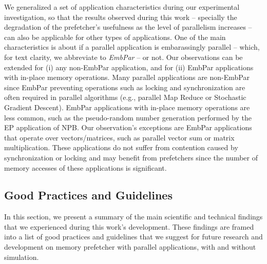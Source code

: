 \documentclass[AMA,final,STIX1COL]{WileyNJD-v2}
\begin{document}
We generalized a set of application characteristics during our experimental investigation, so that the results observed during this work -- specially the degradation of the prefetcher's usefulness as the level of parallelism increases -- can also be applicable for other types of applications. 
One of the main characteristics is about if a parallel application is embarassingly parallel -- which, for text clarity, we abbreviate to \textit{EmbPar} -- or not. 
Our observations can be extended for (i) any non-EmbPar application, and for (ii) EmbPar applications with in-place memory operations. Many parallel applications are non-EmbPar since EmbPar preventing operations such as locking and synchronization are often required in parallel algorithms (e.g., parallel Map Reduce or Stochastic Gradient Descent). EmbPar applications with in-place memory operations are less common, such as the pseudo-random number generation performed by the EP application of NPB. Our observation's exceptions are EmbPar applications that operate over vectors/matrices, such as parallel vector sum or matrix multiplication. These applications do not suffer from contention caused by synchronization or locking and may benefit from prefetchers since the number of memory accesses of these applications is significant.


\subsection{Good Practices and Guidelines}
\label{subsec:practices_n_experiences}
In this section, we present a summary of the main scientific and technical findings that we experienced during this work's development. These findings are framed into a list of good practices and guidelines that we suggest for future research and development on memory prefetcher with parallel applications, with and without simulation.
\end{document}
